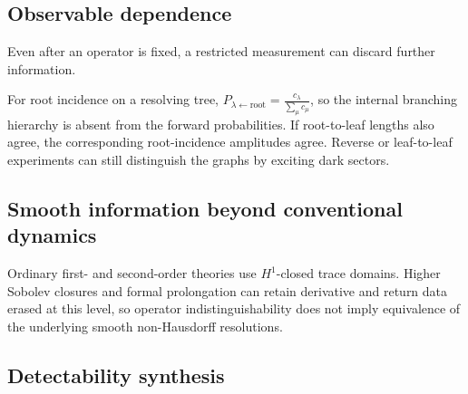 \documentclass[11pt]{article}
\theoremstyle{plain}
\theoremstyle{definition}
\begin{document}
\subsection{Observable dependence}
\label{subsec:detectability-scattering}
\label{subsec:detectability-spectrum}

Even after an operator is fixed, a restricted measurement can discard
further information.

For root incidence on a resolving tree,
\(P_{\lambda\leftarrow\mathrm{root}} = \frac{c_\lambda}{\sum_\mu c_\mu}\),
so the internal branching hierarchy is absent from the forward
probabilities. If root-to-leaf lengths also agree, the corresponding
root-incidence amplitudes agree. Reverse or leaf-to-leaf experiments can
still distinguish the graphs by exciting dark sectors.





\subsection{Smooth information beyond conventional dynamics}
\label{subsec:detectability-smooth}

Ordinary first- and second-order theories use \(H^1\)-closed trace domains. Higher Sobolev closures and formal prolongation can retain derivative and return data erased at this level, so operator indistinguishability does not imply equivalence of the underlying smooth non-Hausdorff resolutions.





\subsection{Detectability synthesis}
\label{subsec:quantum-detectability-theorem}
\end{document}
